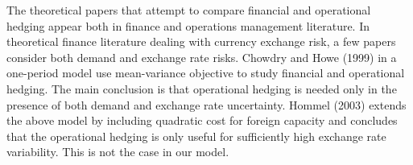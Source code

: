 \documentclass[mnsc,nonblindrev,copyedit]{informs2_wz} %
\newcommand{\OUT}[1]{}
\begin{document}
The theoretical papers that attempt to compare financial and operational hedging appear both in finance and operations management literature.  
In theoretical finance literature dealing with currency exchange risk, a few papers consider both demand and exchange rate risks.  Chowdry and Howe (1999) in a one-period model use mean-variance objective to study financial and operational hedging.  The main conclusion is that operational hedging is needed only in the presence of both demand and exchange rate uncertainty.
Hommel (2003) extends the above model by including quadratic cost for foreign capacity and concludes that the operational hedging is only useful for sufficiently high exchange rate variability.  %
This is not the case in our model.

\OUT{
LATER (?) : Our paper is different from these papers in several aspects.  Our primary question of when financial and when operational hedging is most appropriate, is not directly answered (apart of the special case, when of no demand or no exchange-rate uncertainty).%
Also, their main finding, that operational hedging is necessary only when {\em both} exchange rate and demand are uncertain, is not true in general in our multi-period model.  %
}
\end{document}
